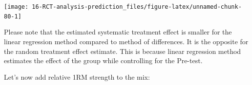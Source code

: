 \documentclass[
]{book}
\newenvironment{Shaded}{\begin{snugshade}}{\end{snugshade}}
\newcommand{\DataTypeTok}[1]{\textcolor[rgb]{0.13,0.29,0.53}{#1}}
\newcommand{\DecValTok}[1]{\textcolor[rgb]{0.00,0.00,0.81}{#1}}
\newcommand{\KeywordTok}[1]{\textcolor[rgb]{0.13,0.29,0.53}{\textbf{#1}}}
\newcommand{\NormalTok}[1]{#1}
\newcommand{\OperatorTok}[1]{\textcolor[rgb]{0.81,0.36,0.00}{\textbf{#1}}}
\newcommand{\StringTok}[1]{\textcolor[rgb]{0.31,0.60,0.02}{#1}}
\begin{document}
\begin{Shaded}
\end{Shaded}

\begin{center}\texttt{[image: 16-RCT-analysis-prediction\_files/figure-latex/unnamed-chunk-80-1]} \end{center}

Please note that the estimated systematic treatment effect is smaller for the linear regression method compared to method of differences. It is the opposite for the random treatment effect estimate. This is because linear regression method estimates the effect of the group while controlling for the Pre-test.

Let's now add relative 1RM strength to the mix:
\end{document}
